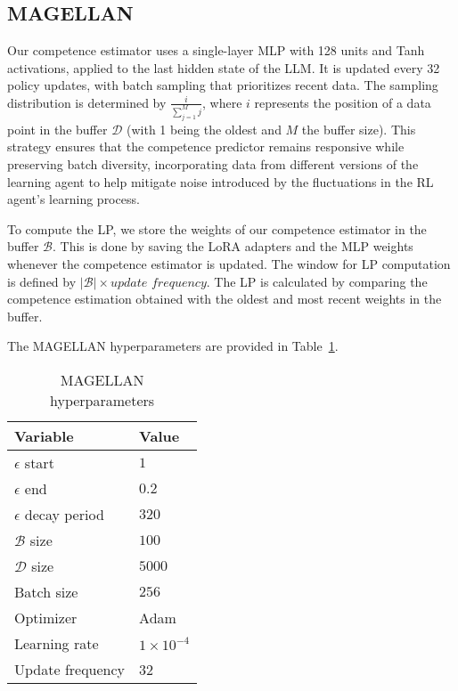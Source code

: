 \subsection{MAGELLAN}
\label{app:implementation_details_magellan}

Our competence estimator uses a single-layer MLP with 128 units and Tanh activations, applied to the last hidden state of the LLM. It is updated every 32 policy updates, with batch sampling that prioritizes recent data. The sampling distribution is determined by $\frac{i}{\sum_{j=1}^{M} j}$, where $i$ represents the position of a data point in the buffer $\mathcal{D}$ (with 1 being the oldest and $M$ the buffer size). This strategy ensures that the competence predictor remains responsive while preserving batch diversity, incorporating data from different versions of the learning agent to help mitigate noise introduced by the fluctuations in the RL agent’s learning process.

To compute the LP, we store the weights of our competence estimator in the buffer $\mathcal{B}$. This is done by saving the LoRA adapters and the MLP weights whenever the competence estimator is updated. The window for LP computation is defined by $|\mathcal{B}| \times \textit{update frequency}$. The LP is calculated by comparing the competence estimation obtained with the oldest and most recent weights in the buffer.

The MAGELLAN hyperparameters are provided in Table~\ref{tab:magellan_param}.

\begin{table}[!ht]
    \caption{MAGELLAN hyperparameters}
    \centering 
    \begin{tabular}{ll}
    \toprule
    \textbf{Variable} & \textbf{Value} \\
    \midrule
    $\epsilon$ start & $1$ \\
    $\epsilon$ end & $0.2$ \\
    $\epsilon$ decay period & $320$ \\
    $\mathcal{B}$ size & $100$ \\
    $\mathcal{D}$ size & $5000$ \\
    Batch size & $256$ \\
    Optimizer & Adam \\
    Learning rate & $1 \times 10^{-4}$ \\
    Update frequency & 32 \\
    \bottomrule
    \end{tabular}
    \label{tab:magellan_param}
\end{table}

